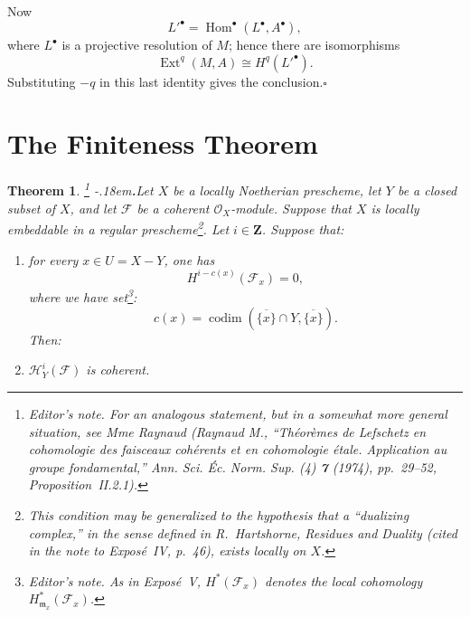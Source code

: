 \documentclass[10pt,a4paper]{article}
\newcommand{\OX}{\mathcal O_X}
\newcommand{\uF}{\underline{\mathrm F}}
\newcommand{\calF}{\mathcal F}
\newcommand{\cF}{\uF}
\newcommand{\ZZ}{\mathbf Z}
\newcommand{\markedfootnote}[2]{\begingroup\renewcommand{\thefootnote}{#1}\footnote{#2}\endgroup}
\theoremstyle{sgatheorem}
\newtheorem{theorem}{Theorem}[section]
\theoremstyle{plain}
\numberwithin{equation}{section}
\begin{document}
Now
\[
  {L'}^\bullet=\operatorname{Hom}^\bullet(L^\bullet,A^\bullet),
\]
where $L^\bullet$ is a projective resolution of $M$; hence there are
isomorphisms
\[
  \operatorname{Ext}^{q}(M,A)\cong H^q({L'}^\bullet).
\]
Substituting $-q$ in this last identity gives the conclusion.\hfill$\square$


\let\cF\calF\renewcommand{\theequation}{\thesection.\arabic{equation}}

\setcounter{section}{1}
\section{The Finiteness Theorem}\label{VIII.2}

\begin{theorem}\label{VIII.2.1}
\markedfootnote{(1)}{\textit{Editor's note.} For an analogous statement, but
in a somewhat more general situation, see Mme Raynaud (Raynaud M., ``Th\'eor\`emes de
Lefschetz en cohomologie des faisceaux coh\'erents et en cohomologie
\'etale. Application au groupe fondamental,'' \emph{Ann. Sci. \'Ec. Norm.
Sup.} (4) \textbf{7} (1974), pp.~29--52, Proposition~II.2.1).}%
\kern-.18em\textbf{.}\enspace Let $X$ be a locally Noetherian prescheme, let $Y$ be a closed subset of $X$,
and let $\cF$ be a coherent $\OX$-module. Suppose that $X$ is locally
embeddable in a regular prescheme\markedfootnote{*}{This condition may be
generalized to the hypothesis that a ``dualizing complex,'' in the sense
defined in R.~Hartshorne, \emph{Residues and Duality} (cited in the note to
Expos\'e~IV, p.~46), exists locally on $X$.}. Let $i\in\ZZ$. Suppose that:
\begin{enumerate}[label=\textup{\alph*)},leftmargin=2.2em,itemsep=0.5\baselineskip]
\item for every $x\in U=X-Y$, one has
\begin{equation*}
  H^{i-c(x)}(\cF_x)=0,
\end{equation*}
where we have set\markedfootnote{(2)}{\textit{Editor's note.} As in
Expos\'e~V, $H^{\ast}(\cF_x)$ denotes the local cohomology
$H^{\ast}_{\mathfrak m_x}(\cF_x)$.}:
\begin{equation}\label{eq:VIII.2.1}
  c(x)=\operatorname{codim}
  (\overline{\{x\}}\cap Y,\overline{\{x\}}).
\end{equation}
Then:
\item $\mathcal H^i_Y(\cF)$ is coherent.
\end{enumerate}
\end{theorem}
\end{document}
